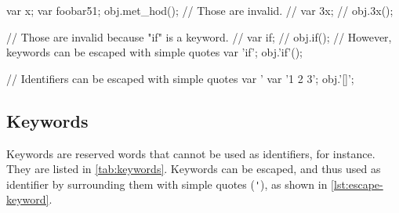 \begin{urbiscript}[caption=Identifiers,label=lst:identifiers,float=\floatpos]
var x;
var foobar51;
obj.met_hod();
// Those are invalid.
// var 3x;
// obj.3x();
\end{urbiscript}

\begin{urbiscript}[caption=Identifiers cannot be keywords,
  label=lst:identifiers-keywords,float=\floatpos]
// Those are invalid because "if" is a keyword.
// var if;
// obj.if();
// However, keywords can be escaped with simple quotes
var 'if';
obj.'if'();
\end{urbiscript}

\begin{urbiscript}[caption=Escaping identifiers with simple quotes,
  label=lst:escape-identifiers,float=\floatpos]
// Identifiers can be escaped with simple quotes
var '%
var '1 2 3';
obj.'[]';
\end{urbiscript}

\subsection{Keywords}
\label{sec:syn-key}

Keywords are reserved words that cannot be used as identifiers, for
instance.  They are listed in \autoref{tab:keywords}.  Keywords can be
escaped, and thus used as identifier by surrounding them with simple
quotes (\lstinline|'|), as shown in \autoref{lst:escape-keyword}.

